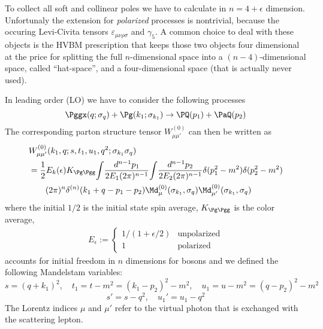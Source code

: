 To collect all soft and collinear poles we have to calculate in $n=4+\epsilon$ dimension. Unfortunaly the extension for \textit{polarized} processes is nontrivial, because the occuring Levi-Civita tensors $\varepsilon_{\mu\nu\rho\sigma}$ and $\gamma_5$. A common choice to deal with these objects is the HVBM prescription\cite{breitenlohner1977} that keeps those two objects four dimensional at the price for splitting the full $n$-dimensional space into a $(n-4)$-dimensional space, called \enquote{hat-space}, and a four-dimensional space (that is actually never used).

In leading order (LO) we have to consider the following processes
\begin{equation}
\Pggx(q;\sigma_q) + \Pg(k_1;\sigma_{k_1}) \rightarrow \PQ(p_1)+\PaQ(p_2)
\end{equation}
The corresponding parton structure tensor $W_{\mu\mu'}^{(0)}$ can then be written as
\begin{align}
&W_{\mu\mu'}^{(0)}(k_1,q;s,t_1,u_1,q^2;\sigma_{k_1}\sigma_{q})\nonumber\\
 &= \frac 1 2 E_k(\epsilon) K_{\Pg\Pgg}\!\int\!\frac{d^{n-1}p_1}{2E_1(2\pi)^{n-1}}\!\int\!\frac{d^{n-1}p_2}{2E_2(2\pi)^{n-1}}\delta(p_1^2-m^2) \delta(p_2^2-m^2)\nonumber\\
 &\hspace{20pt}(2\pi)^n\delta^{(n)}(k_1+q-p_1-p_2) \Md_{\mu}^{(0)}(\sigma_{k_1},\sigma_q)\Md_{\mu'}^{(0)}(\sigma_{k_1},\sigma_q)
\label{eq:PartonicStructureTensor0}\end{align}
where the initial $1/2$ is the initial state spin average, $K_{\Pg\Pgg}$ is the color average,
\begin{align}
E_\epsilon := \left\{\begin{array}{ll}
1/(1+\epsilon/2) &\text{unpolarized}\\
1 &\text{polarized}
\end{array}\right.
\end{align}
accounts for initial freedom in $n$ dimensions for bosons and we defined the following Mandelstam variables:
\begin{equation}
s = (q+k_1)^2, \quad t_1=t-m^2=(k_1-p_2)^2-m^2, \quad u_1 = u - m^2 = (q-p_2)^2 -m^2
\end{equation}
\begin{equation}
s' = s-q^2,\quad u_1' = u_1 - q^2
\end{equation}
The Lorentz indices $\mu$ and $\mu'$ refer to the virtual photon that is exchanged with the scattering lepton.

